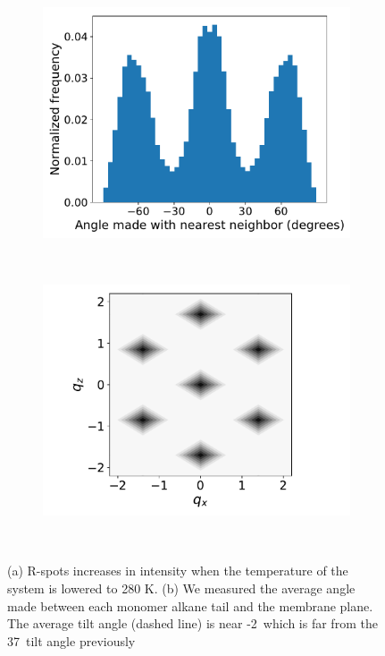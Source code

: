 \documentclass[journal=jpcbfk,manuscript=article]{achemso}
\begin{document}
\begin{figure}[!htb]
\begin{subfigure}[t]{0.32\linewidth}
	        \includegraphics[width=\linewidth]{hexagonal_tail_packing.pdf}
	        \caption{}~\label{fig:layered_tails}
  \end{subfigure}
  \begin{subfigure}[t]{0.32\textwidth}
        	\centering
	        \includegraphics[width=\linewidth]{hexagonal_ft.pdf}  %
	        \caption{}~\label{fig:hexagonal_ft}
  \end{subfigure}
  \caption{(a) R-spots increases in intensity when the temperature of the system is 
	  lowered to 280 K. (b) We measured the average angle made between each
	  monomer alkane tail and the membrane plane. The average tilt angle (dashed
	  line) is near -2\degree~which is far from the 37\degree~tilt angle previously
}
\end{figure}
\end{document}
